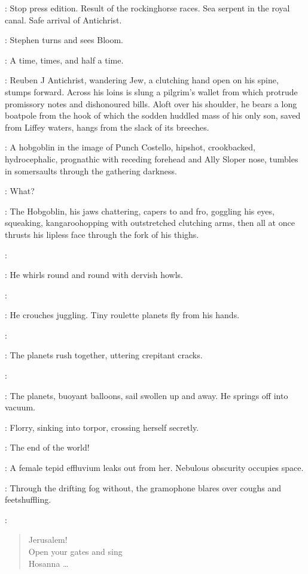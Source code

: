 \Newsboys:
Stop press edition.
Result of the rockinghorse races.
Sea serpent in the royal canal.
Safe arrival of Antichrist.

:
Stephen turns and sees Bloom.

\Stephen:
A time,
times,
and half a time.

:
Reuben J Antichrist,
wandering Jew,
a clutching hand open on his spine,
stumps forward.
Across his loins is slung a pilgrim's wallet from which
protrude promissory notes and dishonoured bills.
Aloft over his shoulder,
he bears a long boatpole
from the hook of which the sodden huddled mass of his only son,
saved from Liffey waters,
hangs from the slack of its breeches.

:
A hobgoblin in the image of Punch Costello,
hipshot,
crookbacked,
hydrocephalic,
prognathic with receding forehead and Ally Sloper nose,
tumbles in somersaults through the gathering darkness.

\All:
What?

:
The Hobgoblin,
his jaws chattering,
capers to and fro,
goggling his eyes,
squeaking,
kangaroohopping with outstretched clutching arms,
then all at once thrusts his lipless face through the fork of his thighs.

\Hobgoblin:

:
He whirls round and round with dervish howls.

\Hobgoblin:

:
He crouches juggling.
Tiny roulette planets fly from his hands.

\Hobgoblin:

:
The planets rush together,
uttering crepitant cracks.

\Hobgoblin:

:
The planets,
buoyant balloons,
sail swollen up and away.
He springs off into vacuum.

:
Florry,
sinking into torpor,
crossing herself secretly.

\Florry:
The end of the world!

:
A female tepid effluvium leaks out from her.
Nebulous obscurity occupies space.

:
Through the drifting fog without,
the gramophone blares over coughs and feetshuffling.

\Gramophone:
\begin{verse}
    Jerusalem!\\
    Open your gates and sing\\
    Hosanna \ldots
\end{verse}

